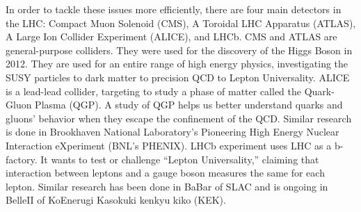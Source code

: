 In order to tackle these issues more efficiently, there are four main detectors in the LHC: Compact Muon Solenoid (CMS), A Toroidal LHC Apparatus (ATLAS), A Large Ion Collider Experiment (ALICE), and LHCb.
CMS and ATLAS are general-purpose colliders. They were used for the discovery of the Higgs Boson in 2012. They are used for an entire range of high energy physics, investigating the SUSY particles to dark matter to precision QCD to Lepton Universality.
ALICE is a lead-lead collider, targeting to study a phase of matter called the Quark-Gluon Plasma (QGP). A study of QGP helps us better understand quarks and gluons' behavior when they escape the confinement of the QCD.
Similar research is done in Brookhaven National Laboratory's Pioneering High Energy Nuclear Interaction eXperiment (BNL's PHENIX).
LHCb experiment uses LHC as a b-factory. It wants to test or challenge ``Lepton Universality,'' claiming that interaction between leptons and a gauge boson measures the same for each lepton.
Similar research has been done in BaBar of SLAC and is ongoing in BelleII of KoEnerugi Kasokuki kenkyu kiko (KEK).

